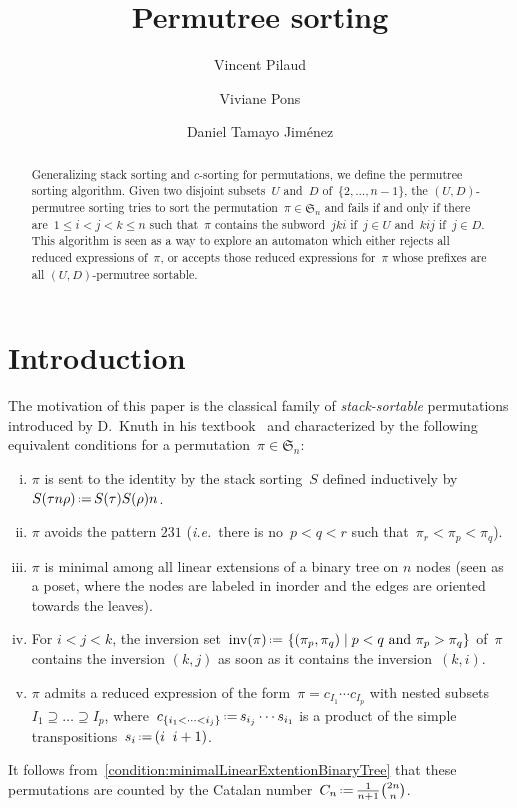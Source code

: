 \documentclass{amsart}
\title{Permutree sorting}
\author{Vincent Pilaud}
\author{Viviane Pons}
\author{Daniel Tamayo Jim\'enez}
\newcommand{\fS}{\mathfrak{S}} %
\newcommand{\set}[2]{\left\{ #1 \;\middle|\; #2 \right\}} %
\newcommand{\eqdef}{\mbox{\,\raisebox{0.2ex}{\scriptsize\ensuremath{\mathrm:}}\ensuremath{=}\,}} %
\newcommand{\defn}[1]{\textsl{\color{darkblue} #1}} %
\newcommand{\ie}{\textit{i.e.}~} %
\DeclareMathOperator{\inv}{inv} %
\begin{document}
\maketitle

\begin{abstract}
Generalizing stack sorting and $c$-sorting for permutations, we define the permutree sorting algorithm.
Given two disjoint subsets~$U$ and~$D$ of~$\{2, \dots, n-1\}$, the $(U,D)$-permutree sorting tries to sort the permutation~$\pi \in \fS_n$ and fails if and only if there are~$1 \le i < j < k \le n$ such that~$\pi$ contains the subword~$jki$ if~$j \in U$ and~$kij$ if~$j \in D$.
This algorithm is seen as a way to explore an automaton which either rejects all reduced expressions of~$\pi$, or accepts those reduced expressions for~$\pi$ whose prefixes are all $(U,D)$-permutree sortable.
\end{abstract}


\section{Introduction}

The motivation of this paper is the classical family of \defn{stack-sortable} permutations introduced by D.~Knuth in his textbook~\cite[Sect.~2.2.1]{Knuth-TAOCP1} and characterized by the following equivalent conditions for a permutation~$\pi \in \fS_n$:
\begin{enumerate}[(i)]
\item \label{condition:stackSorting}
$\pi$ is sent to the identity by the stack sorting~$S$ defined inductively by~$S(\tau n \rho) \eqdef S(\tau) S(\rho) n$.
%
\item \label{condition:patternStack}
$\pi$ avoids the pattern $231$ (\ie there is no~$p < q < r$ such that~$\pi_r < \pi_p < \pi_q$).
%
\item \label{condition:minimalLinearExtentionBinaryTree}
$\pi$ is minimal among all linear extensions of a binary tree on $n$ nodes (seen as a poset, where the nodes are labeled in inorder and the edges are oriented towards the leaves).
%
\item \label{condition:alignedStack}
For $i < j < k$, the inversion set~$\inv(\pi) \eqdef \set{(\pi_p, \pi_q)}{p < q \text{ and } \pi_p > \pi_q}$ of~$\pi$ contains the inversion $(k,j)$ as soon as it contains the inversion~$(k,i)$.
%
\item \label{condition:sortableStack}
$\pi$ admits a reduced expression of the form~$\pi = c_{I_1} \cdots c_{I_p}$ with nested subsets~$I_1 \supseteq \dots \supseteq I_p$, where~$c_{\{i_1 < \dots < i_j\}} \eqdef s_{i_j} \cdots s_{i_1}$ is a product of the simple transpositions~$s_i \eqdef (i \;\; i+1)$.
\end{enumerate}
It follows from~\eqref{condition:minimalLinearExtentionBinaryTree} that these permutations are counted by the Catalan number~$C_n \eqdef \frac{1}{n+1} \binom{2n}{n}$.
\end{document}
